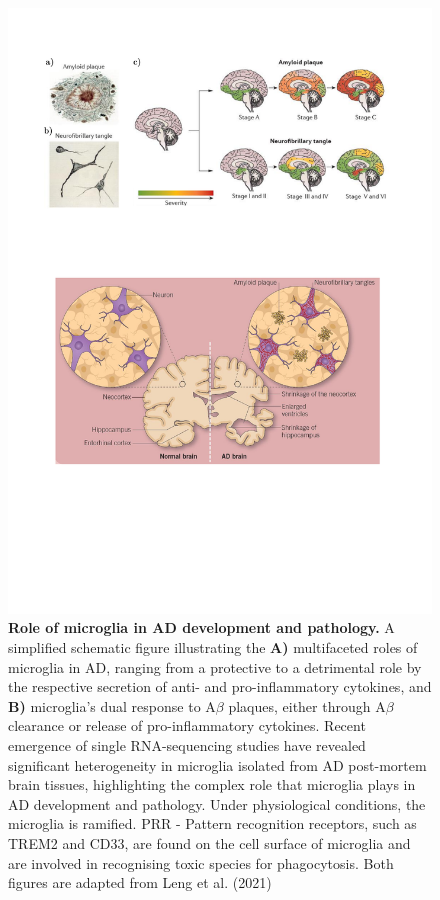\begin{figure}[!htp]
	\centering
	\includegraphics[page=8,trim={0 9cm 0cm 0cm},clip, scale = 0.8]{Figures/Introduction_Figures.pdf}
	\captionsetup{width=0.95\textwidth,singlelinecheck=off}
	\caption[Role of microglia in AD development and pathology]%
	{\textbf{Role of microglia in AD development and pathology.} A simplified schematic figure illustrating the \textbf{A)} multifaceted roles of microglia in AD, ranging from a protective to a detrimental role by the respective secretion of anti- and pro-inflammatory cytokines, and \textbf{B)} microglia's dual response to A$\beta$ plaques, either through A$\beta$ clearance or release of pro-inflammatory cytokines. Recent emergence of single RNA-sequencing studies have revealed significant heterogeneity in microglia isolated from AD post-mortem brain tissues, highlighting the complex role that microglia plays in AD development and pathology. Under physiological conditions, the microglia is ramified. PRR - Pattern recognition receptors, such as TREM2 and CD33, are found on the cell surface of microglia and are involved in recognising toxic species for phagocytosis. Both figures are adapted from Leng et al. (2021)\cite{Leng2021a}  
	}
	\label{fig:microglia_AD}
\end{figure}


